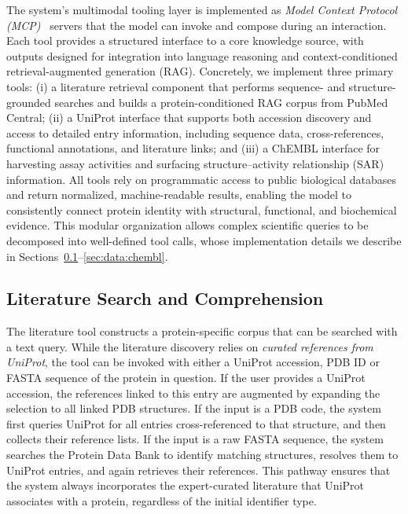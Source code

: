\documentclass{article}
\begin{document}
The system’s multimodal tooling layer is implemented as \emph{Model Context Protocol (MCP)}~\citep{anthropic_introducing_2024} servers that the model can invoke and compose during an interaction. Each tool provides a structured interface to a core knowledge source, with outputs designed for integration into language reasoning and context-conditioned retrieval-augmented generation (RAG). Concretely, we implement three primary tools: (i) a literature retrieval component that performs sequence- and structure-grounded searches and builds a protein-conditioned RAG corpus from PubMed Central; (ii) a UniProt interface that supports both accession discovery and access to detailed entry information, including sequence data, cross-references, functional annotations, and literature links; and (iii) a ChEMBL interface for harvesting assay activities and surfacing structure–activity relationship (SAR) information. All tools rely on programmatic access to public biological databases and return normalized, machine-readable results, enabling the model to consistently connect protein identity with structural, functional, and biochemical evidence. This modular organization allows complex scientific queries to be decomposed into well-defined tool calls, whose implementation details we describe in Sections~\ref{sec:data:literature}--\ref{sec:data:chembl}.


\subsection{Literature Search and Comprehension}\label{sec:data:literature}
The literature tool constructs a protein-specific corpus that can be searched with a text query. While the literature discovery relies on \emph{curated references from UniProt}, the tool can be invoked with either a UniProt accession, PDB ID or FASTA sequence of the protein in question. If the user provides a UniProt accession, the references linked to this entry are augmented by expanding the selection to all linked PDB structures. If the input is a PDB code, the system first queries UniProt for all entries cross-referenced to that structure, and then collects their reference lists. If the input is a raw FASTA sequence, the system searches the Protein Data Bank to identify matching structures, resolves them to UniProt entries, and again retrieves their references. This pathway ensures that the system always incorporates the expert-curated literature that UniProt associates with a protein, regardless of the initial identifier type.
\end{document}
